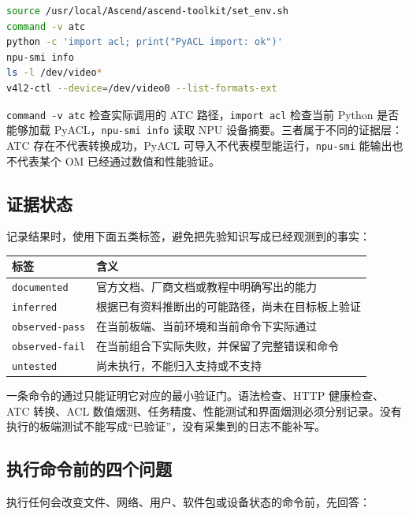 \begin{lstlisting}[language=bash]
source /usr/local/Ascend/ascend-toolkit/set_env.sh
command -v atc
python -c 'import acl; print("PyACL import: ok")'
npu-smi info
ls -l /dev/video*
v4l2-ctl --device=/dev/video0 --list-formats-ext
\end{lstlisting}

\passthrough{\lstinline!command -v atc!} 检查实际调用的 ATC
路径，\passthrough{\lstinline!import acl!} 检查当前 Python 是否能够加载
PyACL，\passthrough{\lstinline!npu-smi info!} 读取 NPU
设备摘要。三者属于不同的证据层：ATC 存在不代表转换成功，PyACL
可导入不代表模型能运行，\passthrough{\lstinline!npu-smi!}
能输出也不代表某个 OM 已经通过数值和性能验证。

\subsection{证据状态}\label{ux8bc1ux636eux72b6ux6001}

记录结果时，使用下面五类标签，避免把先验知识写成已经观测到的事实：

\begin{longtable}[]{@{}ll@{}}
\toprule\noalign{}
标签 & 含义 \\
\midrule\noalign{}
\endhead
\bottomrule\noalign{}
\endlastfoot
\passthrough{\lstinline!documented!} &
官方文档、厂商文档或教程中明确写出的能力 \\
\passthrough{\lstinline!inferred!} &
根据已有资料推断出的可能路径，尚未在目标板上验证 \\
\passthrough{\lstinline!observed-pass!} &
在当前板端、当前环境和当前命令下实际通过 \\
\passthrough{\lstinline!observed-fail!} &
在当前组合下实际失败，并保留了完整错误和命令 \\
\passthrough{\lstinline!untested!} & 尚未执行，不能归入支持或不支持 \\
\end{longtable}

一条命令的通过只能证明它对应的最小验证门。语法检查、HTTP 健康检查、ATC
转换、ACL
数值烟测、任务精度、性能测试和界面烟测必须分别记录。没有执行的板端测试不能写成``已验证''，没有采集到的日志不能补写。

\subsection{执行命令前的四个问题}\label{ux6267ux884cux547dux4ee4ux524dux7684ux56dbux4e2aux95eeux9898}

执行任何会改变文件、网络、用户、软件包或设备状态的命令前，先回答：

